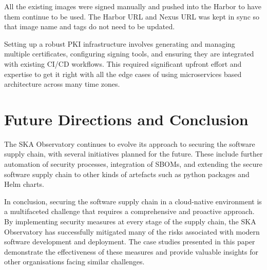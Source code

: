 \documentclass[a4paper]{spie}  %
\begin{document}
All the existing images were signed manually and pushed into the Harbor to have them continue to be used. The Harbor URL and Nexus URL was kept in sync so that image name and tags do not need to be updated.

Setting up a robust PKI infrastructure involves generating and managing multiple certificates, configuring signing tools, and ensuring they are integrated with existing CI/CD workflows. This required significant upfront effort and expertise to get it right with all the edge cases of using microservices based architecture across many time zones.


\section{Future Directions and Conclusion}

The SKA Observatory continues to evolve its approach to securing the software supply chain, with several initiatives planned for the future. These include further automation of security processes, integration of SBOMs, and extending the secure software supply chain to other kinds of artefacts such as python packages and Helm charts.

In conclusion, securing the software supply chain in a cloud-native environment is a multifaceted challenge that requires a comprehensive and proactive approach. By implementing security measures at every stage of the supply chain, the SKA Observatory has successfully mitigated many of the risks associated with modern software development and deployment. The case studies presented in this paper demonstrate the effectiveness of these measures and provide valuable insights for other organisations facing similar challenges.

\end{document}
